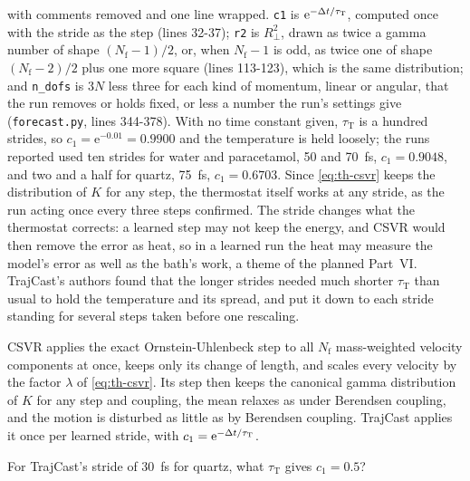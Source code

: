 \noindent with comments removed and one line wrapped. \texttt{c1} is $\mathrm{e}^{-\Delta t/\tau_{
\mathrm T}}$, computed once with the stride as the step (lines 32-37);
\texttt{r2} is $R_\perp^2$, drawn as twice a gamma number of shape $(N_{\mathrm f} -
1)/2$, or, when $N_{\mathrm f} - 1$ is odd, as twice one of shape
$(N_{\mathrm f} - 2)/2$ plus one more square (lines 113-123), which is the
same distribution; and \texttt{n\_dofs} is $3N$ less three for each kind
of momentum, linear or angular, that the run removes or holds fixed, or
less a number the run's settings give (\texttt{forecast.py}, lines
344-378).
With no time constant given, $\tau_{\mathrm T}$ is a hundred strides, so
$c_1 = \mathrm{e}^{-0.01} = 0.9900$ and the temperature is held loosely;
the runs reported used ten strides for water and paracetamol, 50 and
\SI{70}{\femto\second}, $c_1 = 0.9048$, and two and a half for quartz,
\SI{75}{\femto\second}, $c_1 = 0.6703$. Since \cref{eq:th-csvr} keeps the
distribution of $K$ for any step, the thermostat itself works at any
stride, as the run acting once every three steps confirmed. The stride
changes what the thermostat corrects: a learned step may not keep the
energy, and CSVR would then remove the error as heat, so in a learned run
the heat may measure the model's error as well as the bath's work, a
theme of the planned Part~VI. TrajCast's authors found that the longer strides needed
much shorter $\tau_{\mathrm T}$ than usual to hold the temperature and its
spread, and put it down to each stride standing for several steps taken
before one rescaling\cite{Thiemann2026}.

\begin{keyidea}
CSVR applies the exact Ornstein-Uhlenbeck step to all $N_{\mathrm f}$
mass-weighted velocity components at once, keeps only its change of
length, and scales every velocity by the factor $\lambda$ of
\cref{eq:th-csvr}. Its step then keeps the canonical gamma distribution of
$K$ for any step and coupling, the mean relaxes as under Berendsen
coupling, and the motion is disturbed as little as by Berendsen
coupling. TrajCast applies it once per
learned stride, with $c_1 = \mathrm{e}^{-\Delta t/\tau_{\mathrm T}}$.
\end{keyidea}


\begin{selfcheck}
For TrajCast's stride of \SI{30}{\femto\second} for quartz, what
$\tau_{\mathrm T}$ gives $c_1 = 0.5$?
\end{selfcheck}
